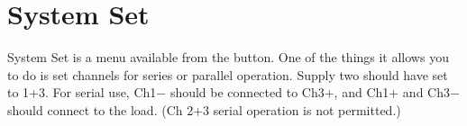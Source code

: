 \section{System Set}
\label{sec:op_low_voltage:system_set}
System Set is a menu available from the  button.  One of the things it allows you to do is set channels for series or parallel operation.  Supply two should have  set to 1+3.  For serial use, Ch1$-$ should be connected to Ch3$+$, and Ch1$+$ and Ch3$-$ should connect to the load.  (Ch 2$+$3 serial operation is not permitted.)

